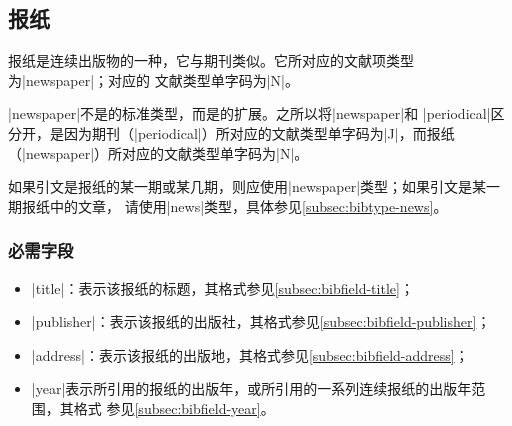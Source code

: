 
\subsection{报纸}\label{subsec:bibtype-newspaper}

报纸是连续出版物的一种，它与期刊类似。它所对应的{\BibTeX}文献项类型为|newspaper|；对应的
文献类型单字码为|N|\cite{gbt3469-1983}。

|newspaper|不是{\BibTeX}的标准类型，而是{\njuthesis}的扩展。之所以将|newspaper|和
|periodical|区分开，是因为期刊（|periodical|）所对应的文献类型单字码为|J|，而报纸
（|newspaper|）所对应的文献类型单字码为|N|\cite{gbt3469-1983}。

\begin{note}
如果引文是报纸的某一期或某几期，则应使用|newspaper|类型；如果引文是某一期报纸中的文章，
请使用|news|类型，具体参见\ref{subsec:bibtype-news}。
\end{note}

\subsubsection{必需字段}

\begin{itemize}
\item |title|：表示该报纸的标题，其格式参见\ref{subsec:bibfield-title}；
\item |publisher|：表示该报纸的出版社，其格式参见\ref{subsec:bibfield-publisher}；
\item |address|：表示该报纸的出版地，其格式参见\ref{subsec:bibfield-address}；
\item |year|表示所引用的报纸的出版年，或所引用的一系列连续报纸的出版年范围，其格式
  参见\ref{subsec:bibfield-year}。
\end{itemize}

